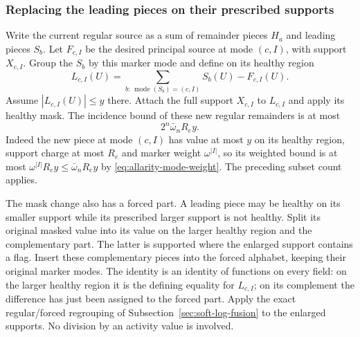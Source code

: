 \subsubsection{Replacing the leading pieces on their prescribed supports}
\label{subsec:allarity-realign}

Write the current regular source as a sum of remainder pieces $H_a$
and leading pieces $S_b$. Let $F_{c,I}$ be the desired principal source
at mode $(c,I)$, with support $X_{c,I}$. Group the $S_b$ by this marker
mode and define on its healthy region
\[
 L_{c,I}(U)=\sum_{b:\,\operatorname{mode}(S_b)=(c,I)}S_b(U)
                        -F_{c,I}(U).
\]
Assume $|L_{c,I}(U)|\le y$ there. Attach the full support $X_{c,I}$
to $L_{c,I}$ and apply its healthy mask. The incidence bound of these
new regular remainders is at most
\begin{equation}\label{eq:allarity-realign-regular}
                         2^n \bar\omega_n R_e y.
\end{equation}
Indeed the new piece at mode $(c,I)$ has value at most $y$ on its
healthy region, support charge at most $R_e$ and marker weight
$\omega^{|I|}$, so its weighted bound is at most
$\omega^{|I|}R_ey\le\bar\omega_nR_ey$ by
\eqref{eq:allarity-mode-weight}. The preceding subset count applies.

The mask change also has a forced part. A leading piece may be healthy
on its smaller support while its prescribed larger support is not
healthy. Split its original masked value into its value on the larger
healthy region and the complementary part. The latter is supported
where the enlarged support contains a flag. Insert these complementary
pieces into the forced alphabet, keeping their original marker modes.
The identity is an identity of functions on every field: on the larger
healthy region it is the defining equality for $L_{c,I}$; on its
complement the difference has just been assigned to the forced part.
Apply the exact regular/forced regrouping of
Subsection~\ref{sec:soft-log-fusion} to the enlarged supports. No division
by an activity value is involved.

